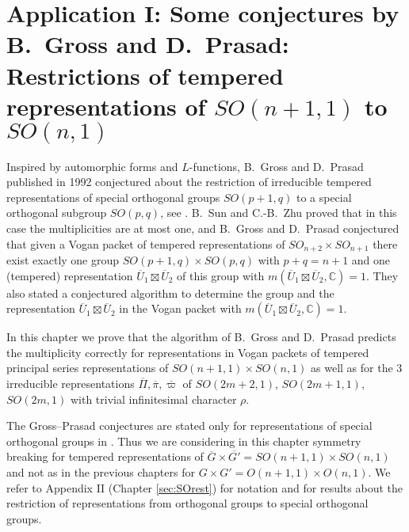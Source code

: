 \newpage
\section{Application I: Some conjectures by B.~Gross and D.~Prasad:  Restrictions of tempered representations of $SO(n+1,1)$ to $SO(n,1)$}
\label{sec:Gross-Prasad}

Inspired by automorphic forms and $L$-functions,
 B.~Gross and D.~Prasad published in 1992 conjectured
 about the restriction of irreducible
 tempered representations
 of special orthogonal groups $SO(p+1,q)$
 to a special orthogonal subgroup $SO(p,q)$, 
 see \cite{GP}.  
B.~Sun and C.-B.~Zhu \cite{SunZhu} proved
 that in this case the multiplicities are at most one,
 and B.~Gross and D.~Prasad conjectured that given a Vogan packet of tempered representations of $SO_{n+2} \times SO_{n+1}$ 
 there exist exactly one group $SO(p+1,q) \times SO(p,q)$
 with $p+q=n+1$
 and one (tempered) representation $\overline{U}_1 \boxtimes \overline{U}_2$
 of this group
 with $m( \overline{U}_1 \boxtimes \overline{U}_2,\mathbb C)=1$.
They also stated a conjectured algorithm
 to determine the  group
 and the  representation $\overline{U}_1 \boxtimes \overline{U}_2$
in the  Vogan packet with   $m( \overline{U}_1 \boxtimes \overline{U}_2,\mathbb C)=1$.

In this chapter
 we prove that the algorithm  of B.~Gross and D.~Prasad predicts the multiplicity correctly  for representations in  Vogan packets of  tempered principal series representations 
 of $SO(n+1,1) \times SO(n,1)$ 
 as well as for the 3 irreducible representations
 $\overline{\Pi}, \overline{\pi}, \overline{\varpi}$ of 
 $SO(2m+2,1)$, $SO(2m+1,1)$, $SO(2m,1)$
 with trivial infinitesimal character $\rho$.


\medskip
The Gross--Prasad conjectures are stated only for representations of special orthogonal groups in  \cite{GP}. 
Thus we are considering in this chapter symmetry breaking for tempered representations of 
$\overline{G}\times \overline{G'}=SO(n+1,1) \times SO(n,1)$ and not as in the previous chapters for $G \times G'=O(n+1,1) \times O(n,1)$. 
We refer to  Appendix II
 (Chapter \ref{sec:SOrest}) for notation and 
 for results about the restriction of representations from orthogonal groups to special orthogonal groups.
 
